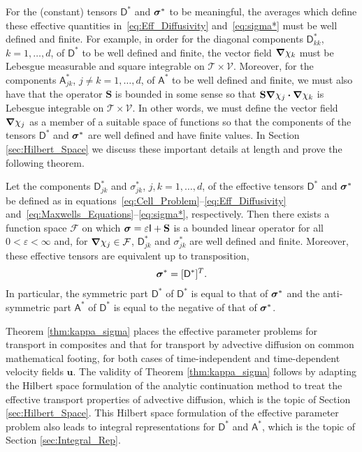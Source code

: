 \documentclass[leqno,onefignum,onetabnum]{siamltex1213}
\newcommand{\Sb}{\mathbf{S}}
\newcommand{\Tc}{\mathcal{T}}
\newcommand{\Vc}{\mathcal{V}}
\newcommand{\Fc}{\mathcal{F}}
\newcommand{\Dm}{\mathsf{D}}
\newcommand{\Am}{\mathsf{A}}
\newcommand{\Ib}{\mathsf{I}}
\newcommand\bsig{\mbox{\boldmath${\sigma}$}}
\newcommand\bnabla{\mbox{\boldmath${\nabla}$}}
\providecommand\bcdot{\boldsymbol{\cdot}}
\newcommand{\vecu}{\boldsymbol{u}}
\begin{document}
For the (constant) tensors $\Dm^*$ and $\bsig^*$ to be
meaningful, the averages which define these effective quantities
in~\eqref{eq:Eff_Diffusivity} and~\eqref{eq:sigma*} must be well
defined 
and finite. For example, in order for the diagonal components
$\Dm^*_{kk}$, $k=1,\ldots,d$, of $\Dm^*$ to be well defined and finite,
the vector field $\bnabla \chi_k$ must be Lebesgue measurable 
and square integrable on $\Tc\times\Vc$. Moreover, for the components
$\Am^*_{jk}$, $j\neq k=1,\ldots,d$, of $\Am^*$ to be well defined and
finite, we must also have that the operator $\Sb$ is bounded in some
sense so that $\Sb\bnabla \chi_j\bcdot\bnabla \chi_k$ is Lebesgue integrable on
$\Tc\times\Vc$. In other words, we must define the vector field
$\bnabla \chi_j$ as a member of a suitable space of functions so that the
components of the tensors $\Dm^*$ and $\bsig^*$ are well defined and
have finite values. In Section \ref{sec:Hilbert_Space} we discuss
these important details at length and prove the following theorem. 
%
\begin{theorem}%
%
Let the components $\Dm^*_{jk}$ and $\sigma^*_{jk}$, $j,k=1,\ldots,d$, of the
effective tensors $\Dm^*$ and $\bsig^*$ be defined as in
equations~\eqref{eq:Cell_Problem}--\eqref{eq:Eff_Diffusivity}
and~\eqref{eq:Maxwells_Equations}--\eqref{eq:sigma*},
respectively. Then 
there exists a function space $\Fc$ on which $\bsig=\varepsilon\Ib+\Sb$ is a
bounded linear operator for all $0<\varepsilon<\infty$ and, for $\bnabla \chi_j\in\Fc$,
$\Dm^*_{jk}$ and $\sigma^*_{jk}$ are well defined and finite.
Moreover, these effective tensors are
equivalent up to transposition,  
% 
\begin{align}%
  \bsig^*=[\Dm^*]^T.
\end{align}
%
In particular, the symmetric part $\Dm^*$ of $\Dm^*$ is equal to
that of $\bsig^*$ and the anti-symmetric part $\Am^*$ of $\Dm^*$
is equal to the negative of that of $\bsig^*$.
%
\end{theorem}
%



Theorem \ref{thm:kappa_sigma} places the effective parameter problems
for transport in composites and that for transport by advective
diffusion on common mathematical footing, for both cases of  
time-independent and time-dependent velocity fields $\vecu $. The
validity of Theorem \ref{thm:kappa_sigma} follows by adapting the
Hilbert space formulation of the analytic continuation method to treat the effective transport
properties of advective diffusion, which is the topic of Section
\ref{sec:Hilbert_Space}. This Hilbert space formulation of the
effective parameter problem also leads to integral representations for
$\Dm^*$ and $\Am^*$, which is the topic of Section
\ref{sec:Integral_Rep}.              
\end{document}
